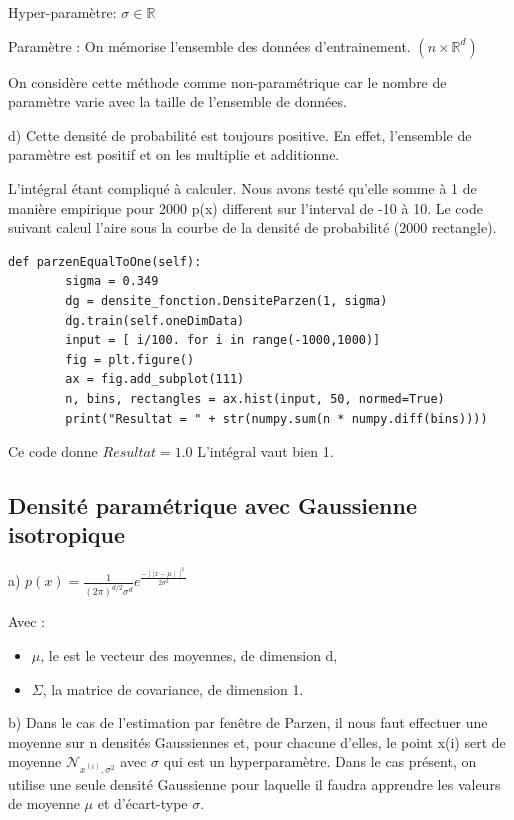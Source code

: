 \documentclass[a4paper,10pt]{article}
\begin{document}
Hyper-paramètre: $\sigma \in \mathds{R}$

Paramètre : On mémorise l'ensemble des données d'entrainement. $( n \times \mathds{R}^{d})$

On considère cette méthode comme non-paramétrique car le nombre de paramètre varie avec la taille de l'ensemble de données.



d)
Cette densité de probabilité est toujours positive. En effet, l'ensemble de paramètre est positif et on les multiplie et additionne. 

L'intégral étant compliqué à calculer. Nous avons testé qu'elle somme à 1 de manière empirique pour 2000 p(x) different sur l'interval de -10 à 10. Le code suivant calcul l'aire sous la courbe de la densité de probabilité (2000 rectangle).

\begin{verbatim}
def parzenEqualToOne(self):
        sigma = 0.349
        dg = densite_fonction.DensiteParzen(1, sigma)
        dg.train(self.oneDimData)
        input = [ i/100. for i in range(-1000,1000)]
        fig = plt.figure()
        ax = fig.add_subplot(111)
        n, bins, rectangles = ax.hist(input, 50, normed=True)
        print("Resultat = " + str(numpy.sum(n * numpy.diff(bins))))
\end{verbatim}

Ce code donne $Resultat = 1.0$
L'intégral vaut bien 1.

\subsection{Densité paramétrique avec Gaussienne isotropique}

a) $p(x) = \frac{1}{(2 \pi)^{d/2} \sigma^{d}} e^{\frac{-\mid\mid x- \mu \mid\mid ^{2}}{2 \sigma^{2}} }$

Avec :
\begin{itemize}
	\item $\mu$, le est le vecteur des moyennes, de dimension d,
	\item $\Sigma$, la matrice de covariance, de dimension 1.
\end{itemize}

b) Dans le cas de l'estimation par fenêtre de Parzen, il nous faut effectuer une moyenne sur n densités Gaussiennes et, pour chacune d'elles, le point x(i) sert de moyenne $\mathcal{N}_{x^{(i)}, \sigma^{2}}$ avec $\sigma$ qui est un hyperparamètre. Dans le cas présent, on utilise une seule densité Gaussienne pour laquelle il faudra apprendre les valeurs de moyenne $\mu$ et d'écart-type $\sigma$.
\end{document}
